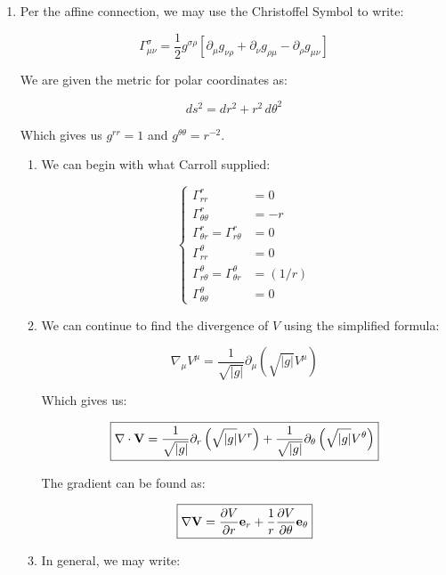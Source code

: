 \begin{enumerate}

  \item Per the affine connection, we may use the Christoffel Symbol to write:

    $$\Gamma^{\sigma}_{\mu\nu}=\frac{1}{2}g^{\sigma\rho}\left[ \partial_{\mu}g_{\nu\rho}+\partial_{\nu}g_{\rho\mu}-\partial_{\rho}g_{\mu\nu}  \right]$$

    We are given the metric for polar coordinates as:

    $$ds^2=dr^2+r^2\,d\theta^2$$

    Which gives us $g^{rr}=1$ and $g^{\theta\theta}=r^{-2}$.

    \begin{enumerate}

      \item 

        We can begin with what Carroll supplied:

        $$\boxed{\left\{\begin{array}{ll} \Gamma^r_{rr} &= 0\\\Gamma^r_{\theta\theta}&=-r\\\Gamma^r_{\theta r}=\Gamma^r_{r\theta}&= 0\\\Gamma^{\theta}_{rr}&= 0\\\Gamma^{\theta}_{r\theta}=\Gamma^{\theta}_{\theta r}&= (1/r)\\\Gamma^{\theta}_{\theta\theta}&= 0\end{array}}$$

      \item 

        We can continue to find the divergence of $V$ using the simplified formula:

        $$\nabla_{\mu}V^{\mu}=\frac{1}{\sqrt{|g|}}\partial_{\mu}\left( \sqrt{|g|}V^{\mu} \right)$$

        Which gives us:

        $$\boxed{\nabla\cdot\bold{V}=\frac{1}{\sqrt{|g|}}\partial_{r}\left( \sqrt{|g|}V^{r} \right)+\frac{1}{\sqrt{|g|}}\partial_{\theta}\left( \sqrt{|g|}V^{\theta} \right)}$$

        The gradient can be found as:

        $$\boxed{\nabla\bold{V}=\frac{\partial V}{\partial r}\bold{e}_r+\frac{1}{r}\frac{\partial V}{\partial \theta}\bold{e}_{\theta}}$$

      \item 

        In general, we may write:


\end{enumerate}
\end{enumerate}
